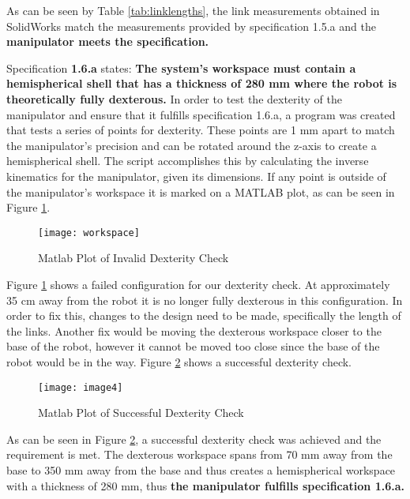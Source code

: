 As can be seen by Table \ref{tab:linklengths}, the link measurements obtained in SolidWorks match the measurements provided by specification 1.5.a and the \textbf{manipulator meets the specification. }


Specification \textbf{1.6.a} states: \textbf{The system’s workspace must contain a hemispherical shell that has a thickness of 280 mm where the robot is theoretically fully dexterous.} In order to test the dexterity of the manipulator and ensure that it fulfills specification 1.6.a, a program was created that tests a series of points for dexterity. These points are 1 mm apart to match the manipulator’s precision and can be rotated around the z-axis to create a hemispherical shell. The script accomplishes this by calculating the inverse kinematics for the manipulator, given its dimensions. If any point is outside of the manipulator’s workspace it is marked on a MATLAB plot, as can be seen in Figure \ref{fig:plot1}.

\newpage
\begin{figure}[htp]
  \centering
  \texttt{[image: workspace]}
  \caption{Matlab Plot of Invalid Dexterity Check}
  \label{fig:plot1}
\end{figure}

Figure \ref{fig:plot1} shows a failed configuration for our dexterity check. At approximately 35 cm away from the robot it is no longer fully dexterous in this configuration. In order to fix this, changes to the design need to be made, specifically the length of the links. Another fix would be moving the dexterous workspace closer to the base of the robot, however it cannot be moved too close since the base of the robot would be in the way. Figure \ref{fig:plot2} shows a successful dexterity check.

\begin{figure}[htp]
  \centering
  \texttt{[image: image4]}
  \caption{Matlab Plot of Successful Dexterity Check}
  \label{fig:plot2}
\end{figure}

As can be seen in Figure \ref{fig:plot2}, a successful dexterity check was achieved and the requirement is met. The dexterous workspace spans from 70 mm away from the base to 350 mm away from the base and thus creates a hemispherical workspace with a thickness of 280 mm, thus \textbf{the manipulator fulfills specification 1.6.a.}


